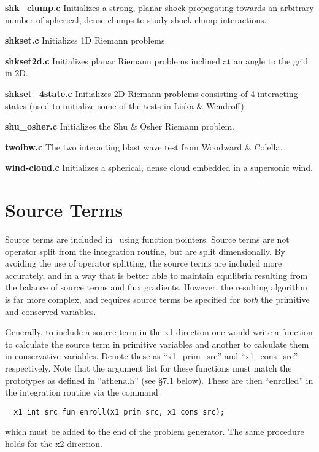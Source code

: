 \bigskip
\noindent
{\bf shk\_clump.c}  Initializes a strong, planar shock propagating towards
an arbitrary number of spherical, dense clumps to study shock-clump 
interactions.

\bigskip
\noindent
{\bf shkset.c}
Initializes 1D Riemann problems.

\bigskip
\noindent
{\bf shkset2d.c}
Initializes planar Riemann problems inclined at an angle to the grid in 2D.

\bigskip
\noindent
{\bf shkset\_4state.c}
Initializes 2D Riemann problems consisting of 4 interacting states (used
to initialize some of the tests in Liska \& Wendroff).

\bigskip
\noindent
{\bf shu\_osher.c}
Initializes the Shu \& Osher Riemann problem.

\bigskip
\noindent
{\bf twoibw.c}
The two interacting blast wave test from Woodward \& Colella.

\bigskip
\noindent
{\bf wind-cloud.c}
Initializes a spherical, dense cloud embedded in a supersonic wind.

\section{Source Terms}

Source terms are included in \ath\ using function pointers.  Source
terms are not operator split from the integration routine, but are
split dimensionally.  By avoiding the use of
operator splitting, the source terms are included more accurately,
and in a way that is better able to maintain equilibria resulting
from the balance of source terms and flux gradients.
However, the resulting algorithm is far more complex, and requires
source terms be specified for {\em both} the primitive and
conserved variables.

Generally, to include a source term in the x1-direction one would
write a function to calculate the source term in primitive variables
and another to calculate them in conservative variables.
Denote these as ``x1\_prim\_src'' and ``x1\_cons\_src'' respectively.
Note that
the argument list for these functions must match the prototypes as
defined in ``athena.h'' (see \S 7.1 below).  These are then ``enrolled'' in the
integration routine via the command
\footnotesize
\begin{verbatim}
  x1_int_src_fun_enroll(x1_prim_src, x1_cons_src);
\end{verbatim}
\normalsize
which must
be added to the end of the problem generator.  The same
procedure holds for the x2-direction.

